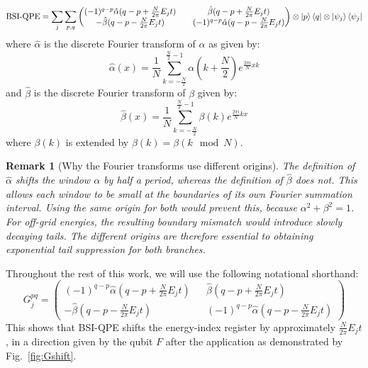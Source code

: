 \documentclass[aps,floatfix,10pt,amssymb,amsfont,amsmath,superscriptaddress,float,nofootinbib,longbibliography,nobalancelastpage,twocolumn]{revtex4-2}
\newtheorem{remark}{Remark}
\begin{document}
\begin{widetext}
\begin{equation}
    \text{BSI-QPE} = \sum_j\sum_{p,q} \begin{pmatrix}
        (-1)^{q-p}\hat\alpha(q-p+\frac{N}{2\pi}E_jt) && \hat\beta(q-p+\frac{N}{2\pi}E_jt)\\
        -\hat\beta (q-p-\frac{N}{2\pi}E_jt) && (-1)^{q-p}\hat\alpha(q-p-\frac{N}{2\pi}E_jt)
    \end{pmatrix}\otimes\ket{p}\bra{q}\otimes\ket{\psi_j}\bra{\psi_j}
\end{equation}
where $\hat \alpha$ is the discrete Fourier transform of $\alpha$ as given by:
\begin{equation}
   \hat\alpha(x) =\frac{1}{N}\sum_{k=-\frac{N}{2}}^{\frac{N}{2}-1} \alpha(k+\frac{N}{2})e^{\frac{2\pi i}{N}xk}
\end{equation}
and $\hat \beta$ is the discrete Fourier transform of $\beta$ given by:
\begin{equation}
    \hat\beta(x) =\frac{1}{N}\sum_{k=-\frac{N}{2}}^{\frac{N}{2}-1} \beta(k)e^{\frac{2\pi i}{N}kx}
\end{equation}
 where $\beta(k)$ is extended by $\beta(k) = \beta(k \mod N)$. 
 \begin{remark}[Why the Fourier transforms use different origins]
     The definition of $\hat\alpha$ shifts the window $\alpha$ by half a period, whereas the definition of $\hat\beta$ does not. This allows each window to be small at the boundaries of its own Fourier summation interval. Using the same origin for both would prevent this, because $\alpha^2+\beta^2=1$. For off-grid energies, the resulting boundary mismatch would introduce slowly decaying tails. The different origins are therefore essential to obtaining exponential tail suppression for both branches.
 \end{remark}
Throughout the rest of this work, we will use the following notational shorthand: 
\begin{equation}
    G_j^{pq} = \begin{pmatrix}
        (-1)^{q-p}\hat\alpha(q-p+\frac{N}{2\pi}E_jt) && \hat\beta(q-p+\frac{N}{2\pi}E_jt)\\
        -\hat\beta (q-p-\frac{N}{2\pi}E_jt) && (-1)^{q-p}\hat\alpha(q-p-\frac{N}{2\pi}E_jt)
    \end{pmatrix}
\end{equation}
This shows that BSI-QPE shifts the energy-index register by approximately $\frac{N}{2\pi}E_jt$, in a direction given by the qubit $F$ after the application as demonstrated by Fig.~\ref{fig:Gshift}. 

\end{widetext}
\end{document}
